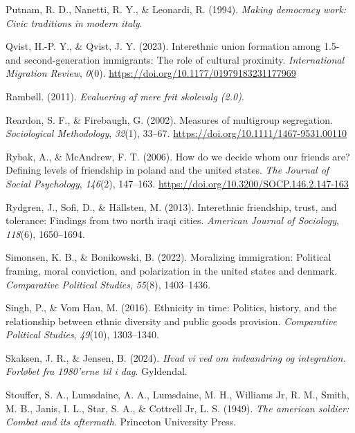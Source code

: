 \documentclass[
]{book}
\newlength{\cslhangindent}
\newenvironment{CSLReferences}[2] %
 {\begin{list}{}{%
  \setlength{\itemindent}{0pt}
  \setlength{\leftmargin}{0pt}
  \setlength{\parsep}{0pt}
  \ifodd #1
   \setlength{\leftmargin}{\cslhangindent}
   \setlength{\itemindent}{-1\cslhangindent}
  \fi
  \setlength{\itemsep}{#2\baselineskip}}}
 {\end{list}}
\begin{document}
\begin{CSLReferences}{1}{0}
Putnam, R. D., Nanetti, R. Y., \& Leonardi, R. (1994). \emph{Making democracy work: Civic traditions in modern italy}.

Qvist, H.-P. Y., \& Qvist, J. Y. (2023). Interethnic union formation among 1.5- and second-generation immigrants: The role of cultural proximity. \emph{International Migration Review}, \emph{0}(0). \url{https://doi.org/10.1177/01979183231177969}

Rambøll. (2011). \emph{Evaluering af mere frit skolevalg (2.0)}.

Reardon, S. F., \& Firebaugh, G. (2002). Measures of multigroup segregation. \emph{Sociological Methodology}, \emph{32}(1), 33--67. \url{https://doi.org/10.1111/1467-9531.00110}

Rybak, A., \& McAndrew, F. T. (2006). How do we decide whom our friends are? Defining levels of friendship in poland and the united states. \emph{The Journal of Social Psychology}, \emph{146}(2), 147--163. \url{https://doi.org/10.3200/SOCP.146.2.147-163}

Rydgren, J., Sofi, D., \& Hällsten, M. (2013). Interethnic friendship, trust, and tolerance: Findings from two north iraqi cities. \emph{American Journal of Sociology}, \emph{118}(6), 1650--1694.

Simonsen, K. B., \& Bonikowski, B. (2022). Moralizing immigration: Political framing, moral conviction, and polarization in the united states and denmark. \emph{Comparative Political Studies}, \emph{55}(8), 1403--1436.

Singh, P., \& Vom Hau, M. (2016). Ethnicity in time: Politics, history, and the relationship between ethnic diversity and public goods provision. \emph{Comparative Political Studies}, \emph{49}(10), 1303--1340.

Skaksen, J. R., \& Jensen, B. (2024). \emph{Hvad vi ved om indvandring og integration. Forløbet fra 1980'erne til i dag}. Gyldendal.

Stouffer, S. A., Lumsdaine, A. A., Lumsdaine, M. H., Williams Jr, R. M., Smith, M. B., Janis, I. L., Star, S. A., \& Cottrell Jr, L. S. (1949). \emph{The american soldier: Combat and its aftermath}. Princeton University Press.


\end{CSLReferences}
\end{document}
